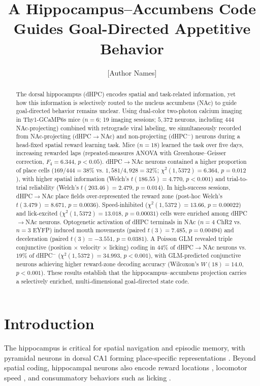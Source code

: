 \documentclass[11pt]{article}
\title{A Hippocampus--Accumbens Code Guides Goal-Directed Appetitive Behavior}
\author{[Author Names]}
\date{}
\begin{document}
\maketitle

\begin{abstract}
The dorsal hippocampus (dHPC) encodes spatial and task-related information, yet how this information is selectively routed to the nucleus accumbens (NAc) to guide goal-directed behavior remains unclear. Using dual-color two-photon calcium imaging in Thy1-GCaMP6s mice ($n=6$; 19 imaging sessions; $5{,}372$ neurons, including $444$ NAc-projecting) combined with retrograde viral labeling, we simultaneously recorded from NAc-projecting (dHPC$\to$NAc) and non-projecting (dHPC$^-$) neurons during a head-fixed spatial reward learning task. Mice ($n=18$) learned the task over five days, increasing rewarded laps (repeated-measures ANOVA with Greenhouse--Geisser correction, $F_{4}=6.344$, $p<0.05$). dHPC$\to$NAc neurons contained a higher proportion of place cells ($169/444 = 38\%$ vs. $1{,}581/4{,}928 = 32\%$; $\chi^2(1,5372)=6.364$, $p=0.012$), with higher spatial information (Welch's $t(186.55)=4.770$, $p<0.001$) and trial-to-trial reliability (Welch's $t(203.46)=2.479$, $p=0.014$). In high-success sessions, dHPC$\to$NAc place fields over-represented the reward zone (post-hoc Welch's $t(3.479)=8.671$, $p=0.0036$). Speed-inhibited ($\chi^2(1,5372)=13.66$, $p=0.00022$) and lick-excited ($\chi^2(1,5372)=13.018$, $p=0.00031$) cells were enriched among dHPC$\to$NAc neurons. Optogenetic activation of dHPC terminals in NAc ($n=4$ ChR2 vs. $n=3$ EYFP) induced mouth movements (paired $t(3)=7.485$, $p=0.00494$) and deceleration (paired $t(3)=-3.551$, $p=0.0381$). A Poisson GLM revealed triple conjunctive (position $\times$ velocity $\times$ licking) coding in $44\%$ of dHPC$\to$NAc neurons vs. $19\%$ of dHPC$^-$ ($\chi^2(1,5372)=34.993$, $p<0.001$), with GLM-predicted conjunctive neurons achieving higher reward-zone decoding accuracy (Wilcoxon's $W(18)=14.0$, $p<0.001$). These results establish that the hippocampus--accumbens projection carries a selectively enriched, multi-dimensional goal-directed state code.
\end{abstract}

\section{Introduction}

The hippocampus is critical for spatial navigation and episodic memory, with pyramidal neurons in dorsal CA1 forming place-specific representations \citep{okeefe1971hippocampus,okeefe1978hippocampus,moser2008place}. Beyond spatial coding, hippocampal neurons also encode reward locations \citep{gauthier2018dedicated,dupret2010reactivation,hollup2001accumulation}, locomotor speed \citep{mcnaughton1983contributions,kropff2015speed}, and consummatory behaviors such as licking \citep{aronov2017mapping}.
\end{document}
